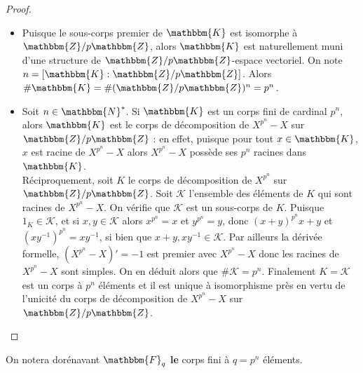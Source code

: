 \documentclass[12pt]{article}
\theoremstyle{remark}\newtheorem{note}{Note}
\theoremstyle{remark}\newtheorem{nota}{Notation}
\newcommand{\N}{\mathbbm{N}}
\newcommand{\Z}{\mathbbm{Z}}
\newcommand{\K}{\mathbbm{K}}
\newcommand{\F}{\mathbbm{F}}
\theoremstyle{definition}
\begin{document}
\begin{proof}\hspace{12pt}
\begin{itemize}
\item Puisque le sous-corps premier de $\K$ est isomorphe à $\Z / p \Z$, alors $\K$ est naturellement muni d'une structure de $\Z / p \Z$-espace vectoriel. On note $n = [ \K : \Z / p \Z ]$. Alors $\# \K = \# (\Z / p \Z)^n = p^n$.
\item Soit $n \in \N^{*}$. Si $\K$ est un corps fini de cardinal $p^n$, alors $\K$ est le corps de décomposition de $X^{p^n} - X$ sur $\Z / p \Z$ : en effet, puisque pour tout $x \in \K$, $x$ est racine de $X^{p^n} - X$ alors $X^{p^n} - X$ possède ses $p^n$ racines dans $\K$.\\
Réciproquement, soit $K$ le corps de décomposition de $X^{p^n}$ sur $\Z / p \Z$. Soit $\mathcal{K}$ l'ensemble des éléments de $K$ qui sont racines de $X^{p^n} - X$. On vérifie que $\mathcal{K}$ est un sous-corps de $K$. Puisque $1_K \in \mathcal{K}$, et si $x,y \in \mathcal{K}$ alors $x^{p^n}= x$ et $y^{p^n} = y$, donc $(x+y)^{p^n} x + y$ et $(xy^{-1})^{p^n} = xy^{-1}$, si bien que $x + y, xy^{-1} \in \mathcal{K}$. Par ailleurs la dérivée formelle, $(X^{p^n} - X)' = -1$ est premier avec $X^{p^n} - X$ donc les racines de $X^{p^n} - X$ sont simples. On en déduit alors que $\# \mathcal{K} = p^n$. Finalement $K = \mathcal{K}$ est un corps à $p^n$ éléments et il est unique à isomorphisme près en vertu de l'unicité du corps de décomposition de $X^{p^n} - X$ sur $\Z / p \Z$.
\end{itemize}
\end{proof}
On notera dorénavant $\F_q$ \textbf{le} corps fini à $q = p^n$ éléments.
\end{document}
